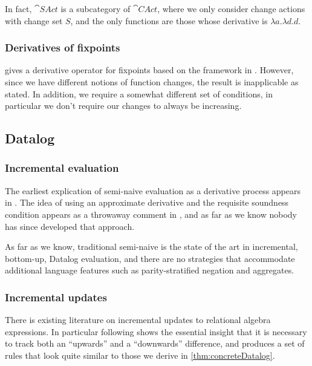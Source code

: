 In fact, $\cat{SAct}$ is a subcategory of $\cat{CAct}$, where we only
consider change actions with change set $S$, and the only functions are those
whose derivative is $\lambda a. \lambda d. d$.

\subsubsection{Derivatives of fixpoints}

\textcite{arntz2017fixpoints} gives a derivative operator for fixpoints based on
the framework in \textcite{cai2014changes}. However, since we have different
notions of function changes, the result is inapplicable as
stated. In addition, we require a somewhat different set of conditions, in particular we
don't require our changes to always be increasing.

\subsection{Datalog}

\subsubsection{Incremental evaluation}

The earliest explication of semi-naive evaluation as a derivative process
appears in \textcite{bancilhon1986naive}. The idea of using an approximate derivative
and the requisite soundness condition appears as a throwaway comment in
\textcite[][section 3.2.2]{bancilhon1986amateur}, and as far as we know nobody has since
developed that approach.

As far as we know, traditional semi-naive is the state of
the art in incremental, bottom-up, Datalog evaluation, and there are no strategies that
accommodate additional language features such as parity-stratified negation and aggregates.

\subsubsection{Incremental updates}

There is existing literature on incremental updates to relational algebra
expressions. In particular \textcite{griffin1997improved} following
\textcite{qian1991incremental} shows the essential insight that it is necessary to
track both an ``upwards'' and a ``downwards'' difference, and produces a set of
rules that look quite similar to those we derive in \cref{thm:concreteDatalog}.

